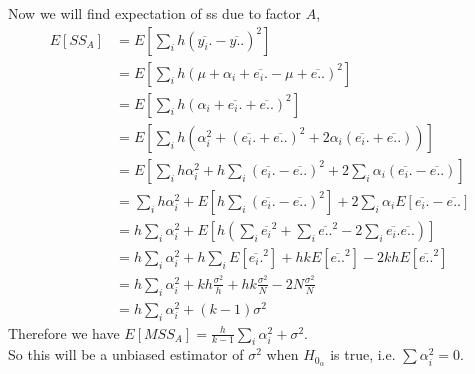 \documentclass[oneside,11pt,pdftex]{book}%
\numberwithin{equation}{section}
\numberwithin{section}{chapter}
\numberwithin{equation}{chapter}
\begin{document}
Now we will find expectation of ss due to factor $ A $,
\begin{align*}
	E[SS_A]&=E\left[\sum_i h \left(\overline{y_i.}-\overline{y..}\right)^2\right]\\
	&=E \left[\sum_i h \left( \mu + \alpha_i + \overline{e_i.} - \mu + \overline{e..} \right)^2\right]\\
	&= E \left[\sum_i h \left( \alpha_i +\overline{e_i.}+\overline{e..} \right)^2\right]\\
	&= E \left[\sum_i h \left(\alpha_i^2 + (\overline{e_i.}+\overline{e..})^2+2\alpha_i (\overline{e_i.}+\overline{e..})\right)\right]\\
	&=E \left[\sum_i h \alpha_i^2 + h \sum_i (\overline{e_i.}-\overline{e..})^2 + 2 \sum_i \alpha_i (\overline{e_i.}-\overline{e..})\right]\\
	&= \sum_i h \alpha_i^2 + E\left[h \sum_i (\overline{e_i.}-\overline{e..})^2\right]+2 \sum_i \alpha_i E[\overline{e_i.}-\overline{e..}]\\
	&= h \sum_i \alpha_i^2 + E\left[h \left(\sum_i \overline{e_i}^2+\sum_i \overline{e..}^2- 2\sum_i \overline{e_i.}\overline{e..}\right)\right]\\
	&= h \sum_i \alpha_i^2 + h \sum_i E[\overline{e_i.}^2]+hk E[\overline{e..}^2]-2kh E[\overline{e..}^2]\\
	&= h \sum_i \alpha_i^2 + kh \frac{\sigma^2}{h}+hk \frac{\sigma^2}{N}-2N \frac{\sigma^2}{N}\\
	&= h \sum_i \alpha_i^2 + (k-1)\sigma^2
\end{align*}
Therefore we have $ E[MSS_A]=\frac{h}{k-1}\sum_{i}\alpha_i^2+\sigma^2 $.\\
So this will be a unbiased estimator of $ \sigma^2 $ when $ H_{0_\alpha} $ is true, i.e. $ \sum \alpha_i^2=0 $.
\end{document}
